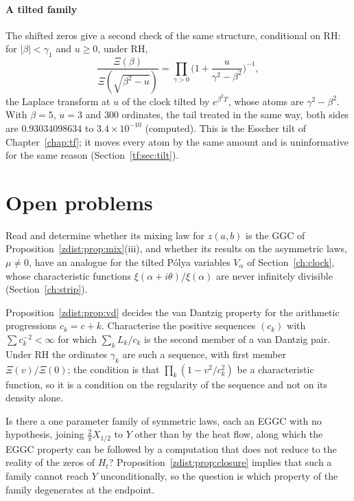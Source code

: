 \paragraph{A tilted family} The shifted zeros give a second check of the same structure, conditional on RH: for $|\beta|<\gamma_1$ and $u\ge0$, under RH,
\[
\frac{\Xi(\beta)}{\Xi(\sqrt{\beta^2-u})}=\prod_{\gamma>0}\Big(1+\frac u{\gamma^2-\beta^2}\Big)^{-1},
\]
the Laplace transform at $u$ of the clock tilted by $e^{\beta^2T}$, whose atoms are $\gamma^2-\beta^2$. With $\beta=5$, $u=3$ and $300$ ordinates, the tail treated in the same way, both sides are $0.93034098634$ to $3.4\times10^{-10}$ (computed). This is the Esscher tilt of Chapter~\ref{chap:tf}; it moves every atom by the same amount and is uninformative for the same reason (Section~\ref{tf:sec:tilt}).

\section{Open problems}\label{zdist:sec:open}

\begin{problem}\label{zdist:prob:bnks}
Read \cite{BNKS82} and determine whether its mixing law for $z(a,b)$ is the GGC of Proposition~\ref{zdist:prop:mix}(iii), and whether its results on the asymmetric laws, $\mu\ne0$, have an analogue for the tilted P\'olya variables $V_\alpha$ of Section~\ref{ch:clock}, whose characteristic functions $\xi(\alpha+i\theta)/\xi(\alpha)$ are never infinitely divisible (Section~\ref{ch:strip}).
\end{problem}

\begin{problem}\label{zdist:prob:vd}
Proposition~\ref{zdist:prop:vd} decides the van Dantzig property for the arithmetic progressions $c_k=c+k$. Characterise the positive sequences $(c_k)$ with $\sum c_k^{-2}<\infty$ for which $\sum_kL_k/c_k$ is the second member of a van Dantzig pair. Under RH the ordinates $\gamma_k$ are such a sequence, with first member $\Xi(v)/\Xi(0)$; the condition is that $\prod_k(1-v^2/c_k^2)$ be a characteristic function, so it is a condition on the regularity of the sequence and not on its density alone.
\end{problem}

\begin{problem}\label{zdist:prob:interp}
Is there a one parameter family of symmetric laws, each an EGGC with no hypothesis, joining $\frac2\pi X_{1/2}$ to $Y$ other than by the heat flow, along which the EGGC property can be followed by a computation that does not reduce to the reality of the zeros of $H_t$? Proposition~\ref{zdist:prop:closure} implies that such a family cannot reach $Y$ unconditionally, so the question is which property of the family degenerates at the endpoint.
\end{problem}

